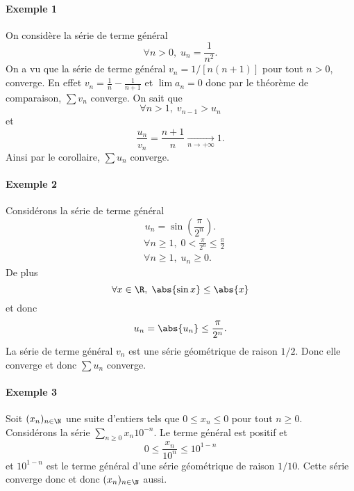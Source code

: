 \documentclass{livre}
\begin{document}

\paragraph{Exemple 1}On considère la série de terme général \[\forall n >0, \; u_n = \frac{1}{n^{2}}.\]
On a vu que la série de terme général $v_n = 1/[n(n+1)]$ pour tout $n>0$, converge. En effet $v_n = \frac{1}{n} - \frac{1}{n+1}$ et $\lim a_n= 0$ donc par le théorème de comparaison, $\sum v_n$ converge. On sait que \[\forall n > 1, \; v_{n-1} > u_n \]et \[ \frac{u_n}{v_n} = \frac{n+1}{n} \underset{n\to +\infty}{\longrightarrow} 1.\]Ainsi par le corollaire, $\sum u_n$ converge.

\paragraph{Exemple 2}Considérons la série de terme général \[u_n = \sin\left(\frac{\pi}{2^{n}}\right). \]
\begin{align*}
&\forall n \geq 1, \; 0 < \frac{\pi}{2^{n}}\leq \frac{\pi}{2}\\
&\forall n \geq 1, \; u_n \geq 0.
\end{align*}
De plus \[\forall x \in \R, \; \abs{\sin x}\leq \abs{x}\]et donc \[u_n = \abs{u_n}\leq \frac{\pi}{2^{n}}. \]La série de terme général $v_n$ est une série géométrique de raison $1/2$. Donc elle converge et donc $\sum u_n$ converge.

\paragraph{Exemple 3}Soit $(x_{n})_{n\in \N}$ une suite d'entiers tels que $0\leq x_n\leq 0$ pour tout $n\geq 0$. Considérons la série $\sum_{n\geq 0}x_n10^{-n}$. Le terme général est positif et \[ 0\leq \frac{x_n}{10^{n}} \leq 10^{1-n}\]et $10^{1-n}$ est le terme général d'une série géométrique de raison $1/10$. Cette série converge donc et donc $(x_n)_{n\in \N}$ aussi.
\end{document}
